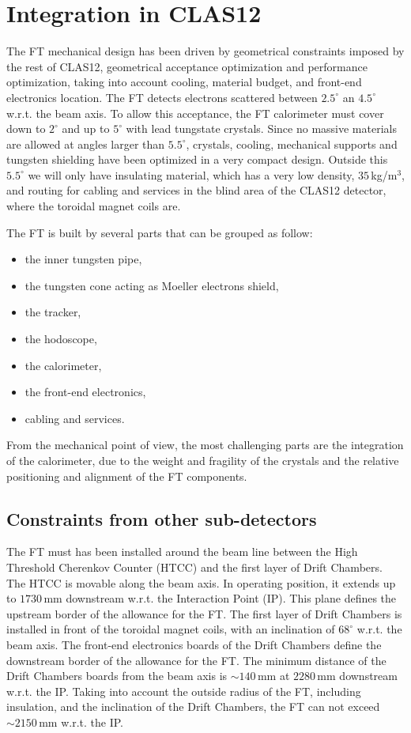 \section{Integration in CLAS12}
The FT mechanical design  has been driven by geometrical constraints imposed by the rest of CLAS12, geometrical acceptance optimization and performance optimization, taking into account cooling, material budget, and front-end electronics location.
The FT detects electrons scattered between $2.5^\circ$ an $4.5^\circ$ w.r.t. the beam axis. To allow this acceptance, the FT calorimeter must cover down to $2^\circ$ and up to $5^\circ$ with lead tungstate crystals. Since no massive materials are allowed at angles larger than $5.5^\circ$, crystals, cooling, mechanical supports and tungsten shielding have been optimized in a very compact design. Outside this $5.5^\circ$ we will only have insulating material, which has a very low density, $35\,$kg/m$^3$, and routing for cabling and services in the blind area of the CLAS12 detector, where the toroidal magnet coils are.

The FT is built by several parts that can be grouped as follow:

\begin{itemize}
\item{the inner tungsten pipe,}
\item{the tungsten cone acting as Moeller electrons shield,}
\item{the tracker,}
\item{the hodoscope,}
\item{the calorimeter,}
\item{the front-end electronics,}
\item{cabling and services.}
\end{itemize}

From the mechanical point of view, the most challenging parts are the integration of the calorimeter, due to the weight and fragility of the crystals and the relative positioning and alignment of the FT components.




\subsection{Constraints from other sub-detectors}

The FT must has been  installed around the beam line between the High Threshold Cherenkov Counter (HTCC) and the first layer of Drift Chambers. The HTCC is movable along the beam axis. In operating position, it extends up to $1730\,$mm downstream w.r.t. the Interaction Point (IP). This plane defines the upstream border of the allowance for the FT. The first layer of Drift Chambers is installed in front of the toroidal magnet coils, with an inclination of $68^\circ$ w.r.t. the beam axis. The front-end electronics boards of the Drift Chambers define the downstream border of the allowance for the FT. The minimum distance of the Drift Chambers boards from the beam axis is $\sim140\,$mm at $2280\,$mm downstream w.r.t. the IP. Taking into account the outside radius of the FT, including insulation, and the inclination of the Drift Chambers, the FT can not exceed $\sim2150\,$mm w.r.t. the IP.

